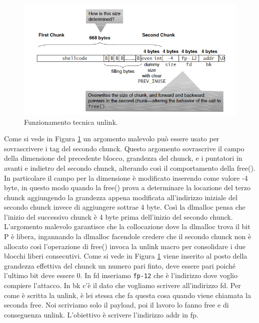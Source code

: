 \begin{figure}[H]
    \centering
    \includegraphics[width=13cm, keepaspectratio]{capitoli/secure_coding/img/cap_4/funzionamento_unlink.png}
    \caption{Funzionamento tecnica unlink.}\label{fig:funzionamento_unlink}
\end{figure}
Come si vede in Figura \ref{fig:funzionamento_unlink} un argomento malevolo può essere usato per sovrascrivere i tag del secondo chunck. Questo argomento sovrascrive il campo della dimensione del precedente blocco, grandezza del chunck, e i puntatori in avanti e indietro del secondo chunck, alterando così il comportamento della free(). In particolare il campo per la dimensione è modificato inserendo come valore -4 byte, in questo modo quando la free() prova a determinare la locazione del terzo chunck aggiungendo la grandezza appena modificata all'indirizzo iniziale del secondo chunck invece di aggiungere sottrae 4 byte. Così la dlmalloc pensa che l'inizio del successivo chunck è 4 byte prima dell'inizio del secondo chunck. L'argomento malevolo garantisce che la collocazione dove la dlmalloc trova il bit P è libera, ingannando la dlmalloc facendole credere che il secondo chunck non è allocato così l'operazione di free() invoca la unlink macro per consolidare i due blocchi liberi consecutivi. Come si vede in Figura \ref{fig:funzionamento_unlink} viene inserito al posto della grandezza effettiva del chunck un numero pari finto, deve essere pari poiché l'ultimo bit deve essere 0.  In fd inseriamo \verb|fp-12| che è l’indirizzo dove voglio compiere l’attacco. In bk c’è il dato che vogliamo scrivere all’indirizzo fd.
Per come è scritta la unlink, è lei stessa che fa questa cosa quando viene chiamata la seconda free.
Noi scriviamo solo il payload, poi il lavoro lo fanno free e di conseguenza unlink. L'obiettivo è scrivere l'indirizzo addr in fp.


